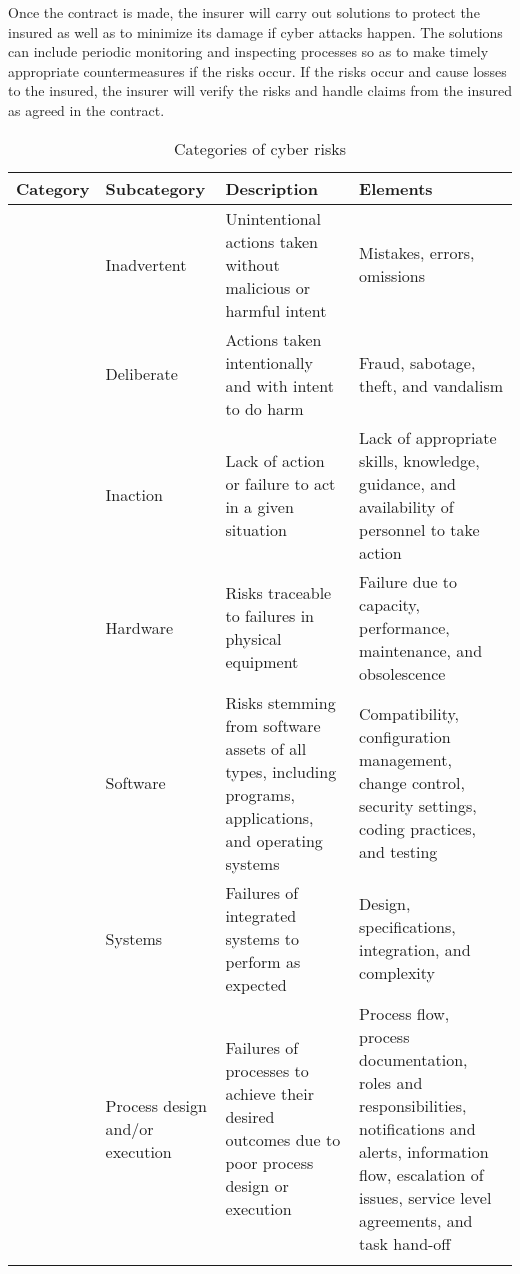 \documentclass[twocolumn,10pt]{IEEEtran}
\begin{document}
Once the contract is made, the insurer will carry out solutions to protect the insured as well as to minimize its damage if cyber attacks happen. The solutions can include periodic monitoring and inspecting processes so as to make timely appropriate countermeasures if the risks occur. If the risks occur and cause losses to the insured, the insurer will verify the risks and handle claims from the insured as agreed in the contract. 


\begin{table*}[!]
	\caption{Categories of cyber risks} 
	\label{table_taxo}
	\begin{centering}
		\begin{tabular}{|>{\centering\arraybackslash}m{1.2cm}|>{\centering\arraybackslash}m{1.7cm}|>{\centering\arraybackslash}m{6.2cm}|>{\centering\arraybackslash}m{5.8cm}|}
			\hline 
			\textbf{Category} & \textbf{Subcategory} & \textbf{Description} & \textbf{Elements} \tabularnewline
			\hline 
			\hline 
			\multirow{5}{*}{\parbox{1.2cm}{Actions of people}}
			& Inadvertent & Unintentional actions taken without malicious or harmful intent & Mistakes, errors, omissions 	\tabularnewline 	\cline{2-4} 
			& Deliberate & Actions taken intentionally and with intent to do harm & Fraud, sabotage, theft, and vandalism 	\tabularnewline	\cline{2-4} 
			& Inaction & Lack of action or failure to act in a given situation & Lack of appropriate skills, knowledge, guidance, and availability of personnel to take action  	\tabularnewline 	\cline{2-4} 
			\hline 
			\multirow{3}{*}{\parbox{1.2cm}{Systems and technology failures}}	
			& Hardware & Risks traceable to failures in physical equipment & Failure due to capacity, performance, maintenance, and obsolescence 	\tabularnewline 	\cline{2-4} 
			& Software & Risks stemming from software assets of all types, including programs, applications, and operating systems & Compatibility, configuration management, change control, security settings, coding practices, and testing 	\tabularnewline	\cline{2-4} 
			& Systems & Failures of integrated systems to perform as expected & Design, specifications, integration, and complexity 	\tabularnewline 	\cline{2-4} 
			\hline 
			\multirow{3}{*}{\parbox{1.2cm}{Failed internal processes}}	
			& Process design and/or execution & Failures of processes to achieve their desired outcomes due to poor process design or execution & Process flow, process documentation, roles and responsibilities, notifications and alerts, information flow, escalation of issues, service level agreements, and task hand-off 	\tabularnewline 	\cline{2-4} 

\end{tabular}
\end{centering}
\end{table*}
\end{document}
